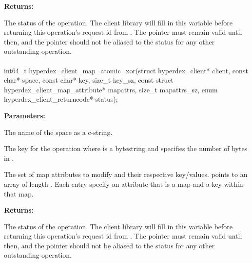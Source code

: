 \noindent\textbf{Returns:}
\begin{description}[labelindent=\widthof{{\code{status}}},leftmargin=*,noitemsep,nolistsep,align=right]
\item[\code{status}] The status of the operation.  The client library will fill in this variable before returning this operation's request id from .  The pointer must remain valid until then, and the pointer should not be aliased to the status for any other outstanding operation.
\end{description}

\paragraph{}
\label{api:c:map_atomic_xor}
\begin{ccode}
int64_t hyperdex_client_map_atomic_xor(struct hyperdex_client* client,
        const char* space,
        const char* key, size_t key_sz,
        const struct hyperdex_client_map_attribute* mapattrs, size_t mapattrs_sz,
        enum hyperdex_client_returncode* status);
\end{ccode}
\funcdesc 

\noindent\textbf{Parameters:}
\begin{description}[labelindent=\widthof{{\code{mapattrs}, \code{mapattrs\_sz}}},leftmargin=*,noitemsep,nolistsep,align=right]
\item[\code{space}] The name of the space as a c-string.
\item[\code{key}, \code{key\_sz}] The key for the operation where  is a bytestring and  specifies the number of bytes in .
\item[\code{mapattrs}, \code{mapattrs\_sz}] The set of map attributes to modify and their respective key/values.   points to an array of length .  Each entry specify an attribute that is a map and a key within that map.
\end{description}

\noindent\textbf{Returns:}
\begin{description}[labelindent=\widthof{{\code{status}}},leftmargin=*,noitemsep,nolistsep,align=right]
\item[\code{status}] The status of the operation.  The client library will fill in this variable before returning this operation's request id from .  The pointer must remain valid until then, and the pointer should not be aliased to the status for any other outstanding operation.
\end{description}


